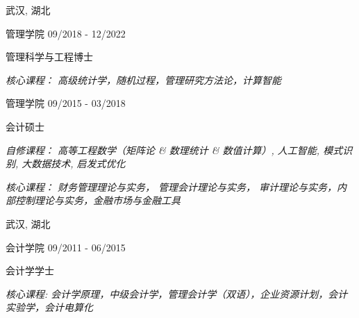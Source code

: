 \vspace{-6.0mm}

\begin{cventries}
\vspace{-1.5mm}
\cveducation
{}
{武汉, 湖北}

\cvsubeducation
{管理学院}
{09/2018 - 12/2022}
{
    \begin{cvitems}
    \item {管理科学与工程博士}
    \item {\itshape{核心课程： 高级统计学，随机过程，管理研究方法论，计算智能}}
    \end{cvitems}
}
\vspace{-1.0mm}

\cvsubeducation
{管理学院}
{09/2015 - 03/2018}
{
    \begin{cvitems}
    \item {会计硕士}
    \item {\itshape{自修课程： 高等工程数学（矩阵论 \& 数理统计 \& 数值计算）, 人工智能, 模式识别, 大数据技术, 启发式优化}}
    \item {\itshape{核心课程： 财务管理理论与实务， 管理会计理论与实务， 审计理论与实务，内部控制理论与实务，金融市场与金融工具}}
    \end{cvitems}
}

\cveducation
{}
{武汉, 湖北}

\cvsubeducation
{会计学院}
{09/2011 - 06/2015}
{
    \begin{cvitems}
    \item {会计学学士}
    \item {\itshape{核心课程: 会计学原理，中级会计学，管理会计学（双语），企业资源计划，会计实验学，会计电算化}}
    \end{cvitems}
}
\end{cventries}